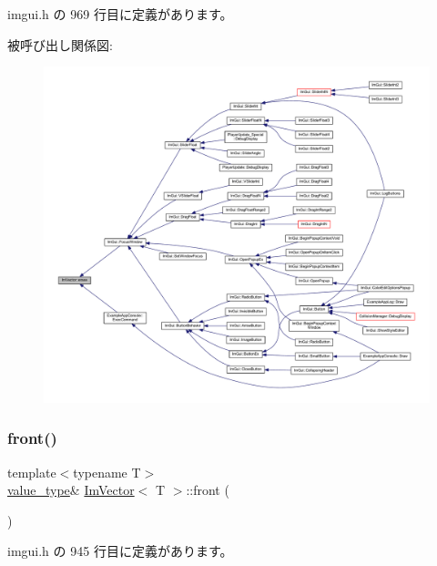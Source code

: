  imgui.\+h の 969 行目に定義があります。

被呼び出し関係図\+:\nopagebreak
\begin{figure}[H]
\begin{center}
\leavevmode
\includegraphics[width=350pt]{class_im_vector_a1e1fd9b678be9d4b4432fbefde976045_icgraph}
\end{center}
\end{figure}
\mbox{\label{class_im_vector_a5b0108d6b1a4a11609723f8305fb9011}} 
\subsubsection{\texorpdfstring{front()}{front()}\hspace{0.1cm}{\footnotesize\ttfamily [1/2]}}
{\footnotesize\ttfamily template$<$typename T$>$ \\
\mbox{\hyperlink{class_im_vector_a8bd77e4e7581d8e5f9e98d7c2f3c2a80}{value\+\_\+type}}\& \mbox{\hyperlink{class_im_vector}{Im\+Vector}}$<$ T $>$\+::front (\begin{DoxyParamCaption}{ }\end{DoxyParamCaption})\hspace{0.3cm}{\ttfamily [inline]}}



 imgui.\+h の 945 行目に定義があります。

